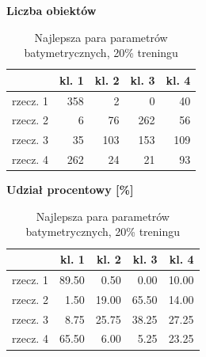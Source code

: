 \documentclass[11pt,a4paper]{article}
\begin{document}
\begin{table}[H]
\centering
\small
\caption{Najlepsza para parametrów batymetrycznych, 20\% treningu}
\begin{minipage}{0.47\textwidth}
\centering
\textbf{Liczba obiektów}\\[0.35em]
\begin{tabular}{lrrrr}
\toprule
 & kl. 1 & kl. 2 & kl. 3 & kl. 4 \\
\midrule
rzecz. 1 & 358 & 2 & 0 & 40 \\
rzecz. 2 & 6 & 76 & 262 & 56 \\
rzecz. 3 & 35 & 103 & 153 & 109 \\
rzecz. 4 & 262 & 24 & 21 & 93 \\
\bottomrule
\end{tabular}
\end{minipage}\hfill
\begin{minipage}{0.47\textwidth}
\centering
\textbf{Udział procentowy [\%]}\\[0.35em]
\begin{tabular}{lrrrr}
\toprule
 & kl. 1 & kl. 2 & kl. 3 & kl. 4 \\
\midrule
rzecz. 1 & 89.50 & 0.50 & 0.00 & 10.00 \\
rzecz. 2 & 1.50 & 19.00 & 65.50 & 14.00 \\
rzecz. 3 & 8.75 & 25.75 & 38.25 & 27.25 \\
rzecz. 4 & 65.50 & 6.00 & 5.25 & 23.25 \\
\bottomrule
\end{tabular}
\end{minipage}
\end{table}
\end{document}
